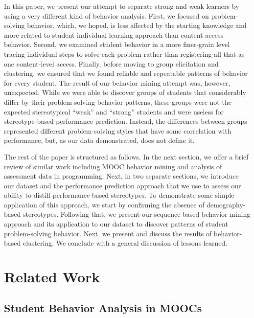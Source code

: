 \documentclass{sigchi}
\begin{document}
In this paper, we present our attempt to separate strong and weak learners by using a very different kind of behavior analysis. First, we focused on problem-solving behavior, which, we hoped, is less affected by the starting knowledge and more related to student individual learning approach than content access behavior. Second, we examined student behavior in a more finer-grain level tracing individual steps to solve each problem rather than registering all that as one content-level access. Finally, before moving to group elicitation and clustering, we ensured that we found reliable and repeatable patterns of behavior for every student. The result of our behavior mining attempt was, however, unexpected. While we were able to discover groups of students that considerably differ by their problem-solving behavior patterns, these groups were not the expected stereotypical ``weak'' and ``strong'' students and were useless for stereotype-based performance prediction. Instead, the differences between groups represented different problem-solving styles that have some correlation with performance, but, as our data demonstrated, does not define it. 

The rest of the paper is structured as follows. In the next section, we offer a brief review of similar work including MOOC behavior mining and analysis of assessment data in programming. Next, in two separate sections, we introduce our dataset and the performance prediction approach that we use to assess our ability to distill performance-based stereotypes. To demonstrate some simple application of this approach, we start by confirming the absence of demography-based stereotypes. Following that, we present our sequence-based behavior mining approach and its application to our dataset to discover patterns of student problem-solving behavior. Next, we present and discuss the results of behavior-based clustering. We conclude with a general discussion of lessons learned. 

\section{Related Work}

\subsection{Student Behavior Analysis in MOOCs}
\end{document}
